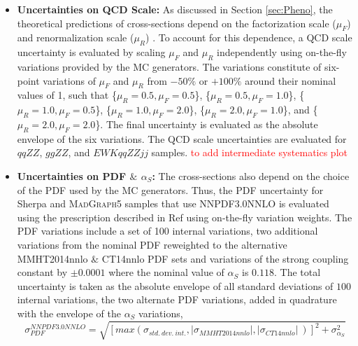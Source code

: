 \begin{itemize}
\item{\textbf{Uncertainties on QCD Scale:} As discussed in Section \ref{sec:Pheno}, the theoretical predictions of cross-sections depend on the factorization scale ($\mu_{F}$) and renormalization scale ($\mu_{R}$) \cite{QCDScaleAndPDFUnc}. To account for this dependence, a QCD scale uncertainty is evaluated by scaling $\mu_{F}$ and $\mu_{R}$ independently using on-the-fly variations provided by the MC generators. The variations constitute of six-point variations of $\mu_{F}$ and $\mu_{R}$ from $-50\%$ or $+100\%$ around their nominal values of 1, such that \{$\mu_R = 0.5, \mu_F = 0.5$\}, \{$\mu_R = 0.5, \mu_F = 1.0$\}, \{$\mu_R = 1.0, \mu_F = 0.5$\}, \{$\mu_R = 1.0, \mu_F = 2.0$\}, \{$\mu_R = 2.0, \mu_F = 1.0$\}, and \{$\mu_R = 2.0, \mu_F = 2.0$\}. The final uncertainty is evaluated as the absolute envelope of the six variations. The QCD scale uncertainties are evaluated for $qqZZ$, $ggZZ$, and $EWK qqZZjj$ samples. \textcolor{red}{to add intermediate systematics plot} %

}
\item{\textbf{Uncertainties on PDF $\&$ $\alpha_{S}$:} The cross-sections also depend on the choice of the PDF used by the MC generators. Thus, the PDF uncertainty for Sherpa and \textsc{MadGraph5} samples that use NNPDF3.0NNLO is evaluated using the prescription described in Ref \cite{PDFForRunII} using on-the-fly variation weights. The PDF variations include a set of 100 internal variations, two additional variations from the nominal PDF reweighted to the alternative MMHT2014nnlo \cite{MMHT2014PDFs} $\&$ CT14nnlo \cite{CT14nnlo} PDF sets and variations of the strong coupling constant by $\pm0.0001$ where the nominal value of $\alpha_{S}$ is $0.118$. The total uncertainty is taken as the absolute envelope of all standard deviations of $100$ internal variations, the two alternate PDF variations, added in quadrature with the envelope of the $\alpha_{S}$ variations, 
\begin{equation}
    \sigma_{PDF}^{NNPDF3.0NNLO} = \sqrt{ [ max (\sigma_{std.~dev.~int.}, |\sigma_{MMHT2014nnlo}| , |\sigma_{CT14nnlo}|~)]^2 + \sigma_{\alpha_S}^2 }
\end{equation}

}
\end{itemize}

